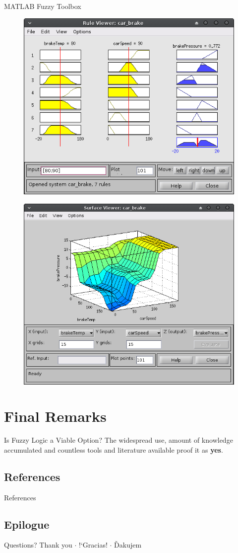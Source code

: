 \documentclass[hyperref={unicode}]{beamer}
\begin{document}
\begin{frame}[allowframebreaks]{MATLAB Fuzzy Toolbox}
\begin{figure}
	\end{figure}
	\begin{figure}
	\includegraphics[width=.75\textwidth]{sw-5}
	\end{figure}
	\begin{figure}
	\includegraphics[width=.75\textwidth]{sw-6}
	\end{figure}
\end{frame}


\section{Final Remarks}

\begin{frame}{Is Fuzzy Logic a Viable Option?}
	The widespread use, amount of knowledge accumulated and countless tools and literature available proof it as \textbf{yes}.
\end{frame}


\subsection{References}

\begin{frame}[allowframebreaks]{References}
	\printbibliography%
\end{frame}


\subsection{Epilogue}

\begin{frame}{Questions?}
	\centering
	{\large Thank you $\cdot$ !`Gracias! $\cdot$ Ďakujem}
\end{frame}
\end{document}
